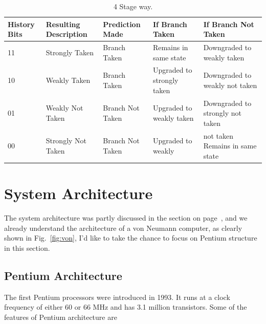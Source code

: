 \documentclass[doc,natbib,12pt]{apa6}
\begin{document}
	\begin{table}[htpb]
		\centering
		\begin{tabular}{p{1in}|p{1in}|p{1in}|p{1in}|p{1in}}
			History Bits & Resulting Description & Prediction Made & If Branch Taken & If Branch Not Taken \\\hline
			11    & Strongly Taken &    Branch Taken    & Remains in same state    & Downgraded to weakly taken \\
			10 &    Weakly Taken &    Branch Taken &    Upgraded to strongly taken &    Downgraded to weakly not taken \\
			01    & Weakly Not Taken &    Branch Not Taken &    Upgraded to weakly taken &    Downgraded to strongly not taken \\
			00    & Strongly Not Taken &     Branch Not Taken &    Upgraded to weakly & not taken    Remains in same state
		\end{tabular}
		\caption{\label{tab:BTB}4 Stage way. }
	\end{table}
	
	
	
	\newpage
	\section{System Architecture} \label{chp:systemArchitecture}
	
	The system architecture was partly discussed in the section on page~\pageref{chp:computerArchitecture}, and we already understand the architecture of a von Neumann computer, as clearly shown in Fig.~\vref{fig:von}, I'd like to take the chance to focus on Pentium structure in this section.
	
	\subsection{Pentium Architecture}
	
	The first Pentium processors were introduced in 1993. It runs at a clock frequency of either 60 or 66 MHz and has 3.1 million transistors. Some of the features of Pentium architecture are \citep{Das}
	
\end{document}
